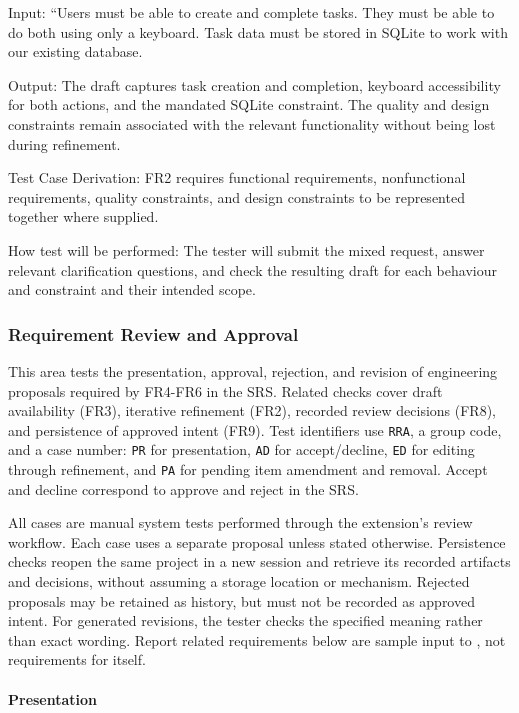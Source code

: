 \documentclass[12pt, titlepage]{article}
\begin{document}
\begin{enumerate}
Input: ``Users must be able to create and complete tasks. They must be able to
do both using only a keyboard. Task data must be stored in SQLite to work with
our existing database.

Output: The draft captures task creation and completion, keyboard
accessibility for both actions, and the mandated SQLite constraint. The
quality and design constraints remain associated with the relevant
functionality without being lost during refinement.

Test Case Derivation: FR2 requires functional requirements, nonfunctional
requirements, quality constraints, and design constraints to be represented
together where supplied.

How test will be performed: The tester will submit the mixed request, answer
relevant clarification questions, and check the resulting draft for each
behaviour and constraint and their intended scope.

\end{enumerate}

\subsubsection{Requirement Review and Approval}

This area tests the presentation, approval, rejection, and revision of
engineering proposals required by FR4-FR6 in the SRS.
Related checks cover draft availability (FR3), iterative refinement (FR2),
recorded review decisions (FR8), and persistence of approved intent (FR9).
Test identifiers use \texttt{RRA}, a group code, and a case number:
\texttt{PR} for presentation, \texttt{AD} for accept/decline,
\texttt{ED} for editing through refinement, and \texttt{PA} for pending item
amendment and removal. Accept and decline correspond to approve and reject
in the SRS.

All cases are manual system tests performed through the extension's review
workflow. Each case uses a separate proposal unless stated otherwise.
Persistence checks reopen the same project in a new session and retrieve
its recorded artifacts and decisions, without assuming a storage location
or mechanism. Rejected proposals may be retained as history, but must not
be recorded as approved intent. For generated revisions, the tester checks
the specified meaning rather than exact wording. Report related requirements
below are sample input to \progname{}, not requirements for \progname{} itself.

\paragraph{Presentation}
\end{document}
